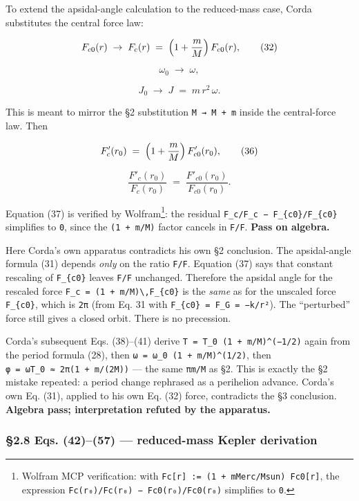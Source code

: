 \documentclass[
  11pt,
]{article}
\begin{document}
To extend the apsidal-angle calculation to the reduced-mass case, Corda
substitutes the central force law:

\[
F_{c0}(r) \;\to\; F_{c}(r) \;=\; \Bigl(1 + \frac{m}{M}\Bigr)\,F_{c0}(r), \tag{32}
\]

\[
\omega_{0} \;\to\; \omega, \tag{33}
\]

\[
J_{0} \;\to\; J \;=\; m\,r^{2}\,\omega. \tag{34}
\]

This is meant to mirror the §2 substitution \texttt{M\ →\ M\ +\ m}
inside the central-force law. Then

\[
F'_{c}(r_{0}) \;=\; \Bigl(1 + \frac{m}{M}\Bigr)\,F'_{c0}(r_{0}), \tag{36}
\]

\[
\frac{F'_{c}(r_{0})}{F_{c}(r_{0})}
\;=\; \frac{F'_{c0}(r_{0})}{F_{c0}(r_{0})}. \tag{37}
\]

Equation (37) is verified by Wolfram\footnote{Wolfram MCP verification:
  with \texttt{Fc{[}r{]}\ :=\ (1\ +\ mMerc/Msun)\ Fc0{[}r{]}}, the
  expression
  \texttt{Fc\textquotesingle{}(r₀)/Fc(r₀)\ −\ Fc0\textquotesingle{}(r₀)/Fc0(r₀)}
  simplifies to \texttt{0}.}: the residual
\texttt{F\textquotesingle{}\_c/F\_c\ −\ F\textquotesingle{}\_\{c0\}/F\_\{c0\}}
simplifies to \texttt{0}, since the \texttt{(1\ +\ m/M)} factor cancels
in \texttt{F\textquotesingle{}/F}. \textbf{Pass on algebra.}

Here Corda's own apparatus contradicts his own §2 conclusion. The
apsidal-angle formula (31) depends \emph{only} on the ratio
\texttt{F\textquotesingle{}/F}. Equation (37) says that constant
rescaling of \texttt{F\_\{c0\}} leaves \texttt{F\textquotesingle{}/F}
unchanged. Therefore the apsidal angle for the rescaled force
\texttt{F\_c\ =\ (1\ +\ m/M)\textbackslash{},F\_\{c0\}} is the
\emph{same} as for the unscaled force \texttt{F\_\{c0\}}, which is
\texttt{2π} (from Eq. 31 with \texttt{F\_\{c0\}\ =\ F\_G\ =\ −k/r²}).
The ``perturbed'' force still gives a closed orbit. There is no
precession.

Corda's subsequent Eqs. (38)--(41) derive
\texttt{T\ =\ T\_0\ (1\ +\ m/M)\^{}(−1/2)} again from the period formula
(28), then \texttt{ω\ =\ ω\_0\ (1\ +\ m/M)\^{}(1/2)}, then
\texttt{φ\ =\ ωT\_0\ ≈\ 2π(1\ +\ m/(2M))} --- the same \texttt{πm/M} as
§2. This is exactly the §2 mistake repeated: a period change rephrased
as a perihelion advance. Corda's own Eq. (31), applied to his own Eq.
(32) force, contradicts the §3 conclusion. \textbf{Algebra pass;
interpretation refuted by the apparatus.}

\hypertarget{eqs.-4257-reduced-mass-kepler-derivation}{%
\subsubsection{§2.8 Eqs. (42)--(57) --- reduced-mass Kepler
derivation}\label{eqs.-4257-reduced-mass-kepler-derivation}}
\end{document}

